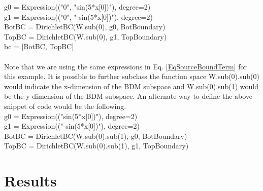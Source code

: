 \documentclass[12pt,3p]{article}
\begin{document}
{\selectfont
g0 = Expression(("0", "sin(5*x[0])"), degree=2) \\
g1 = Expression(("0", "-sin(5*x[0])"), degree=2) \\
BotBC = DirichletBC(W.sub(0), g0, BotBoundary) \\
TopBC = DirichletBC(W.sub(0), g1, TopBoundary) \\
bc = [BotBC, TopBC] \\ \\
}
Note that we are using the same expressions in Eq. \ref{EqSourceBoundTerm} for this example. It is possible to further subclass the function space {\selectfont W.sub(0).sub(0)} would indicate the x-dimension of the BDM subspace and {\selectfont W.sub(0).sub(1)} would be the y dimension of the BDM subspace. An alternate way to define the above snippet of code would be the following.\\
{\selectfont
g0 = Expression(("sin(5*x[0])"), degree=2) \\
g1 = Expression(("-sin(5*x[0])"), degree=2) \\
BotBC = DirichletBC(W.sub(0).sub(1), g0, BotBoundary) \\
TopBC = DirichletBC(W.sub(0).sub(1), g1, TopBoundary) 
}

\section{Results}
\vspace{-2ex}
\end{document}
